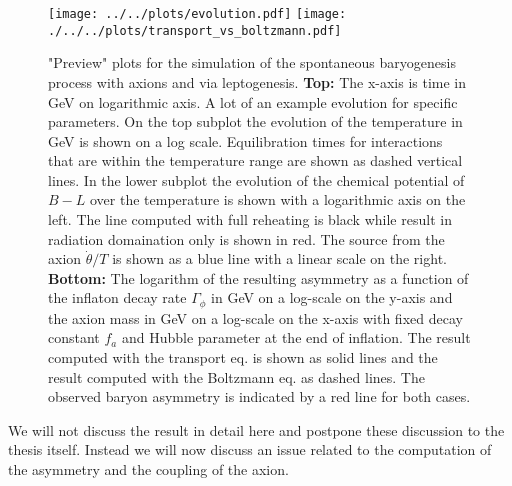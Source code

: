 \documentclass[13pt,a4paper,titlepage]{article}
\begin{document}
\begin{figure}
    \centering
    \texttt{[image: ../../plots/evolution.pdf]} %
    \texttt{[image: ./../../plots/transport\_vs\_boltzmann.pdf]} %
    \caption{"Preview" plots for the simulation of the spontaneous baryogenesis process with axions and via leptogenesis.
    \textbf{Top:} The x-axis is time in GeV on logarithmic axis. A lot of an example evolution for specific parameters. On the top subplot the evolution of the temperature in GeV is shown on a log scale. Equilibration times for interactions that are within the temperature range are shown as dashed vertical lines. In the lower subplot the evolution of the chemical potential of $B - L$ over the temperature is shown with a logarithmic axis on the left. The line computed with full reheating is black while result in radiation domaination only is shown in red. The source from the axion $\dot{\theta} / T$ is shown as a blue line with a linear scale on the right.  \textbf{Bottom:} The logarithm of the resulting asymmetry as a function of the inflaton decay rate $\Gamma_\phi$ in GeV on a log-scale on the y-axis and the axion mass in GeV on a log-scale on the x-axis with fixed decay constant $f_a$ and Hubble parameter at the end of inflation. The result computed with the transport eq. is shown as solid lines and the result computed with the Boltzmann eq. as dashed lines. The observed baryon asymmetry is indicated by a red line for both cases. }
    \label{fig:naive_model_plot}
\end{figure}
We will not discuss the result in detail here and postpone these discussion to the thesis itself.
Instead we will now discuss an issue related to the computation of the asymmetry and the coupling of the axion.
\end{document}
